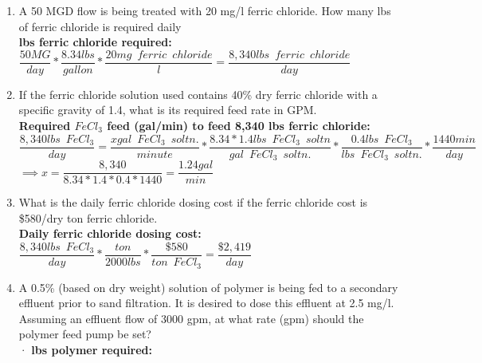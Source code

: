 \begin{enumerate}
\vspace{0.25cm}
\item A 50 MGD flow is being treated with 20 mg/l ferric chloride.   How many lbs of ferric chloride is required daily \\
\vspace{0.3cm}
\textbf{lbs ferric chloride required:}\\
$\dfrac{50 MG}{day}*\dfrac{8.34lbs}{gallon}*\dfrac{20mg \enspace ferric \enspace chloride}{l}=\boxed{\dfrac{8,340 lbs \enspace ferric \enspace chloride}{day}}$\\
\vspace{0.25cm}
\item If the ferric chloride solution used contains 40\% dry ferric chloride with a specific gravity of 1.4, what is its required feed rate in GPM.\\
\vspace{0.25cm}
\textbf{Required $FeCl_3$ feed (gal/min) to feed 8,340 lbs ferric chloride:}\\
\vspace{0.25cm}
$\dfrac{8,340 lbs \enspace FeCl_3}{day}=\dfrac{x gal \enspace FeCl_3 \enspace soltn.}{minute}*\dfrac{8.34*1.4 lbs \enspace FeCl_3 \enspace soltn}{gal \enspace FeCl_3 \enspace soltn.}*\dfrac{0.4 lbs \enspace FeCl_3}{lbs \enspace FeCl_3 \enspace soltn.}*\dfrac{1440min}{day}$\\
\vspace{0.25cm}
$\implies x=\dfrac{8,340}{8.34*1.4*0.4*1440}=\boxed{\dfrac{1.24gal}{min}}$\\
\vspace{0.25cm}
\item What is the daily ferric chloride dosing cost if the ferric chloride cost is \$580/dry ton ferric chloride.\\
\textbf{Daily ferric chloride dosing cost:}\\
\vspace{0.25cm}
$\dfrac{8,340lbs \enspace FeCl_3}{day}*\dfrac{ton}{2000 lbs}*\dfrac{\$580}{ton \enspace FeCl_3}=\boxed{\dfrac{\$2,419}{day}}$
\vspace{0.25cm}
\item A 0.5\% (based on dry weight) solution of polymer is being fed to a secondary effluent prior to sand filtration. It is desired to dose this effluent at 2.5 mg/l. Assuming an effluent flow of 3000 gpm, at what rate (gpm)  should  the polymer feed pump be set?\\	·
\vspace{0.25cm}
\textbf{lbs polymer required:}\\

\end{enumerate}
